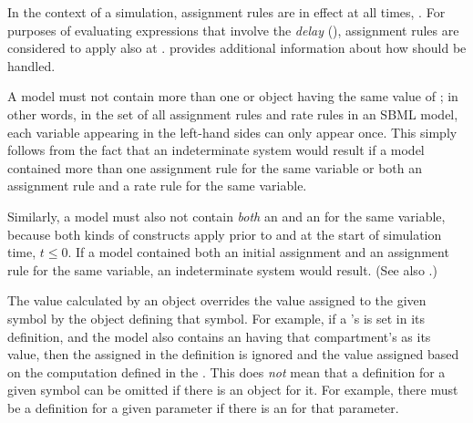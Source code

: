 
In the context of a simulation, assignment rules are in effect at
all times, .  For purposes of evaluating expressions
that involve the \emph{delay} 
(), assignment rules are considered
to apply also at .   provides
additional information about how  should be
  handled.

A model must not contain more than one \AssignmentRule or
\RateRule object having the same value of ; in
other words, in the set of all assignment rules and rate rules in
an SBML model, each variable appearing in the left-hand sides can
only appear once.  This simply follows from the fact that an
indeterminate system would result if a model contained more than
one assignment rule for the same variable or both an assignment
rule and a rate rule for the same variable.

Similarly, a model must also not contain \emph{both} an
\AssignmentRule and an \InitialAssignment for the same variable,
because both kinds of constructs apply prior to and at the start
of simulation time, \ie $t \leq 0$.  If a model contained both an
initial assignment and an assignment rule for the same variable,
an indeterminate system would result.  (See also
.)

The value calculated by an \AssignmentRule object overrides the
value assigned to the given symbol by the object defining that
symbol.  For example, if a \Compartment's  is set in
its definition, and the model also contains an \AssignmentRule
having that compartment's  as its 
value, then the  assigned in the \Compartment
definition is ignored and the value assigned based on the
computation defined in the \AssignmentRule.  This does \emph{not}
mean that a definition for a given symbol can be omitted if there
is an \AssignmentRule object for it.  For example, there must be a
\Parameter definition for a given parameter if there is an
\AssignmentRule for that parameter.



